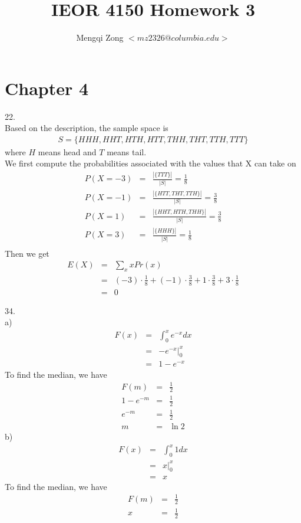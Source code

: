 \documentclass[12pt]{article}
\title{IEOR 4150 Homework 3}
\author{Mengqi Zong $<mz2326@columbia.edu>$}
\begin{document}
\maketitle

\setlength{\parindent}{0in}

\section*{Chapter 4}

22. \\
Based on the description, the sample space is
\begin{eqnarray*}
  S = \{ HHH, HHT, HTH, HTT, THH, THT, TTH, TTT\}
\end{eqnarray*}
where $H$ means head and $T$ means tail. \\

We first compute the probabilities associated with the values that X can take on
\begin{eqnarray*}
  P(X = -3) &=& \frac {|\{ TTT \}|}{|S|} = \frac {1}{8} \\
  P(X = -1) &=& \frac {|\{ HTT, THT, TTH \}|}{|S|} = \frac {3}{8} \\
  P(X =  1) &=& \frac {|\{ HHT, HTH, THH \}|}{|S|} = \frac {3}{8} \\
  P(X =  3) &=& \frac {|\{ HHH \}|}{|S|} = \frac {1}{8} \\
\end{eqnarray*}
Then we get
\begin{eqnarray*}
  E(X) &=& \sum_x x Pr(x) \\
       &=& (-3) \cdot \frac {1}{8} + (-1) \cdot \frac {3}{8}
           + 1 \cdot \frac {3}{8} + 3 \cdot \frac {1}{8} \\
       &=& 0
\end{eqnarray*}

34. \\
a)
\begin{eqnarray*}
  F(x) &=& \int_0^x e^{-x} dx \\
       &=& -e^{-x}|_0^x \\
       &=& 1 - e^{-x}
\end{eqnarray*}
To find the median, we have
\begin{eqnarray*}
  F(m) &=& \frac {1}{2} \\
  1 - e^{-m} &=& \frac {1}{2} \\ 
  e^{-m} &=& \frac {1}{2} \\
  m &=& \ln 2
\end{eqnarray*}
b)
\begin{eqnarray*}
  F(x) &=& \int_0^x 1 dx \\
       &=& x|_0^x \\
       &=& x
\end{eqnarray*}
To find the median, we have
\begin{eqnarray*}
  F(m) &=& \frac {1}{2} \\
  x &=& \frac {1}{2} \\ 
\end{eqnarray*}
\end{document}
